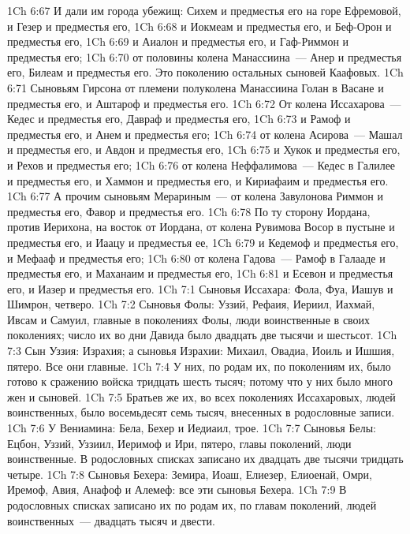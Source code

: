 \vs 1Ch 6:67 И дали им города убежищ: Сихем и предместья его на горе Ефремовой, и Гезер и предместья его,
\vs 1Ch 6:68 и Иокмеам и предместья его, и Беф-Орон и предместья его,
\vs 1Ch 6:69 и Аиалон и предместья его, и Гаф-Риммон и предместья его;
\vs 1Ch 6:70 от половины колена Манассиина~--- Анер и предместья его, Билеам и предместья его. Это поколению остальных сыновей Каафовых.
\vs 1Ch 6:71 Сыновьям Гирсона от племени полуколена Манассиина  Голан в Васане и предместья его, и Аштароф и предместья его.
\vs 1Ch 6:72 От колена Иссахарова~--- Кедес и предместья его, Давраф и предместья его,
\vs 1Ch 6:73 и Рамоф и предместья его, и Анем и предместья его;
\vs 1Ch 6:74 от колена Асирова~--- Машал и предместья его, и Авдон и предместья его,
\vs 1Ch 6:75 и Хукок и предместья его, и Рехов и предместья его;
\vs 1Ch 6:76 от колена Неффалимова~--- Кедес в Галилее и предместья его, и Хаммон и предместья его, и Кириафаим и предместья его.
\vs 1Ch 6:77 А прочим сыновьям Мерариным~--- от колена Завулонова Риммон и предместья его, Фавор и предместья его.
\vs 1Ch 6:78 По ту сторону Иордана, против Иерихона, на восток от Иордана, от колена Рувимова  Восор в пустыне и предместья его, и Иаацу и предместья ее,
\vs 1Ch 6:79 и Кедемоф и предместья его, и Мефааф и предместья его;
\vs 1Ch 6:80 от колена Гадова~--- Рамоф в Галааде и предместья его, и Маханаим и предместья его,
\vs 1Ch 6:81 и Есевон и предместья его, и Иазер и предместья его.
\vs 1Ch 7:1 Сыновья Иссахара: Фола, Фуа, Иашув и Шимрон, четверо.
\vs 1Ch 7:2 Сыновья Фолы: Уззий, Рефаия, Иериил, Иахмай, Ивсам и Самуил, главные в поколениях Фолы, люди воинственные в своих поколениях; число их во дни Давида было двадцать две тысячи и шестьсот.
\vs 1Ch 7:3 Сын Уззия: Израхия; а сыновья Израхии: Михаил, Овадиа, Иоиль и Ишшия, пятеро. Все они главные.
\vs 1Ch 7:4 У них, по родам их, по поколениям их, было готово к сражению войска тридцать шесть тысяч; потому что у них было много жен и сыновей.
\vs 1Ch 7:5 Братьев же их, во всех поколениях Иссахаровых, людей воинственных, было восемьдесят семь тысяч, внесенных в родословные записи.
\rsbpar\vs 1Ch 7:6 У Вениамина: Бела, Бехер и Иедиаил, трое.
\vs 1Ch 7:7 Сыновья Белы: Ецбон, Уззий, Уззиил, Иеримоф и Ири, пятеро, главы поколений, люди воинственные. В родословных списках записано их двадцать две тысячи тридцать четыре.
\vs 1Ch 7:8 Сыновья Бехера: Земира, Иоаш, Елиезер, Елиоенай, Омри, Иремоф, Авия, Анафоф и Алемеф: все эти сыновья Бехера.
\vs 1Ch 7:9 В родословных списках записано их по родам их, по главам поколений, людей воинственных~--- двадцать тысяч и двести.
